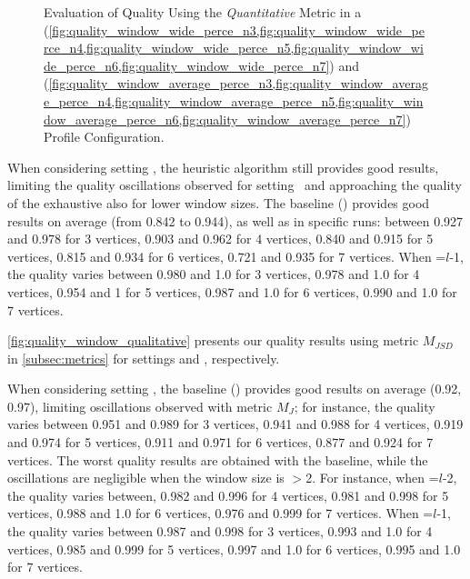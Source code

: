 \begin{figure}[H]
\begin{adjustbox}{minipage=\linewidth,scale=0.75}
\begin{subfigure}{0.45\textwidth}
        \end{subfigure}

        \caption{Evaluation of Quality Using the \emph{Quantitative} Metric in a \wide (\cref{fig:quality_window_wide_perce_n3,fig:quality_window_wide_perce_n4,fig:quality_window_wide_perce_n5,fig:quality_window_wide_perce_n6,fig:quality_window_wide_perce_n7}) and \average (\cref{fig:quality_window_average_perce_n3,fig:quality_window_average_perce_n4,fig:quality_window_average_perce_n5,fig:quality_window_average_perce_n6,fig:quality_window_average_perce_n7}) Profile Configuration.}  \label{fig:quality_window_perce}
      \end{adjustbox}
    \end{figure}

    When considering setting \average, the heuristic algorithm still provides good results, limiting the quality oscillations observed for setting \wide\ and approaching the quality of the exhaustive also for lower window sizes. The baseline () provides good results on average (from 0.842 to 0.944), as well as in specific runs: between 0.927 and 0.978 for 3 vertices, 0.903 and 0.962 for 4 vertices, 0.840 and 0.915 for 5 vertices, 0.815 and 0.934 for 6 vertices, 0.721 and 0.935 for 7 vertices.
    When \windowsize=$l$-1, the quality varies between 0.980 and 1.0 for 3 vertices, 0.978 and 1.0 for 4 vertices, 0.954 and 1 for 5 vertices, 0.987 and 1.0 for 6 vertices, 0.990 and 1.0 for 7 vertices.

    \cref{fig:quality_window_qualitative} {\color{OurColor2}presents} our quality results using metric $M_{JSD}$ in \cref{subsec:metrics} for settings \wide and \average, respectively.

    When considering setting \wide, the baseline () provides good results on average (0.92, 0.97), limiting oscillations observed with metric $M_J$; for instance, the quality varies between 0.951 and 0.989 for 3 vertices, 0.941 and 0.988 for 4 vertices, 0.919 and 0.974 for 5 vertices, 0.911 and 0.971 for 6 vertices, 0.877 and 0.924 for 7 vertices.
    The worst quality results are obtained with the baseline, while the oscillations are negligible when the window size is $>$2. For instance, when \windowsize=$l$-2, the quality varies between, 0.982 and 0.996 for 4 vertices, 0.981 and 0.998 for 5 vertices, 0.988 and 1.0 for 6 vertices, 0.976 and 0.999 for 7 vertices. When \windowsize=$l$-1, the quality varies between  0.987 and  0.998 for 3 vertices, 0.993 and 1.0 for 4 vertices, 0.985 and 0.999 for 5 vertices, 0.997 and 1.0 for 6 vertices, 0.995 and 1.0  for 7 vertices.

